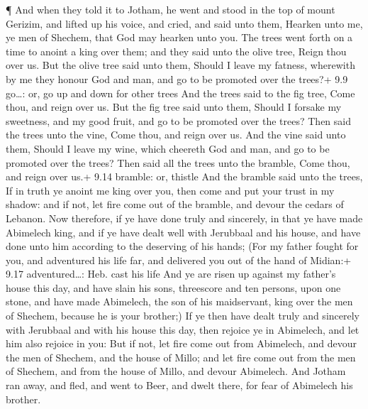  ¶ And when they told it to Jotham, he went and stood in the
top of mount Gerizim, and lifted up his voice, and cried, and said unto
them, Hearken unto me, ye men of Shechem, that God may hearken unto you.
 The trees went forth on a time to anoint a king over them;
and they said unto the olive tree, Reign thou over us.  But
the olive tree said unto them, Should I leave my fatness, wherewith by
me they honour God and man, and go to be promoted over the trees?+ 9.9
go\ldots: or, go up and down for other trees  And the trees
said to the fig tree, Come thou, and reign over us.  But
the fig tree said unto them, Should I forsake my sweetness, and my good
fruit, and go to be promoted over the trees?  Then said the
trees unto the vine, Come thou, and reign over us.  And the
vine said unto them, Should I leave my wine, which cheereth God and man,
and go to be promoted over the trees?  Then said all the
trees unto the bramble, Come thou, and reign over us.+ 9.14 bramble: or,
thistle  And the bramble said unto the trees, If in truth
ye anoint me king over you, then come and put your trust in my shadow:
and if not, let fire come out of the bramble, and devour the cedars of
Lebanon.  Now therefore, if ye have done truly and
sincerely, in that ye have made Abimelech king, and if ye have dealt
well with Jerubbaal and his house, and have done unto him according to
the deserving of his hands;  (For my father fought for you,
and adventured his life far, and delivered you out of the hand of
Midian:+ 9.17 adventured\ldots: Heb. cast his life  And ye
are risen up against my father's house this day, and have slain his
sons, threescore and ten persons, upon one stone, and have made
Abimelech, the son of his maidservant, king over the men of Shechem,
because he is your brother;)  If ye then have dealt truly
and sincerely with Jerubbaal and with his house this day, then rejoice
ye in Abimelech, and let him also rejoice in you:  But if
not, let fire come out from Abimelech, and devour the men of Shechem,
and the house of Millo; and let fire come out from the men of Shechem,
and from the house of Millo, and devour Abimelech.  And
Jotham ran away, and fled, and went to Beer, and dwelt there, for fear
of Abimelech his brother.

